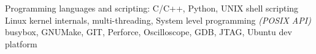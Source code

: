 \documentclass[10pt,a4paper]{article} %
\begin{document}



%




\spacedhrule{0.5em}{-0.4em} %


\inlineheadsection %
{Programming languages and scripting:} {C/C++, Python, UNIX shell scripting}
 {Linux kernel internals, multi-threading, System level programming \textit{(POSIX API)}}
 {busybox, GNUMake, GIT, Perforce, Oscilloscope, GDB, JTAG, Ubuntu dev platform}
{}
\end{document}
